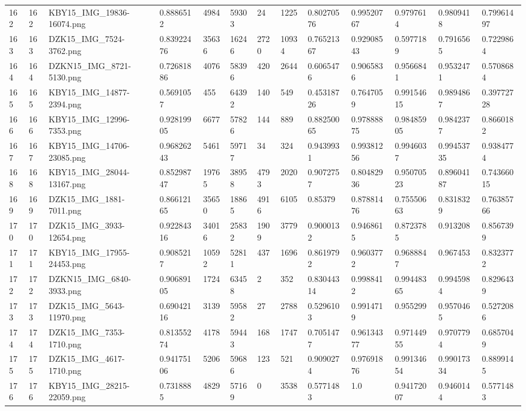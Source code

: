 \documentclass[11pt, a4paper, twoside]{report}
\begin{document}
\begin{longtable}[c]{@{}lllllllllllll@{}}
162 & 162 & KBY15\_IMG\_19836-16074.png & 0.8886512 & 4984 & 59303 & 24 & 1225 & 0.80270576 & 0.99520767 & 0.9797614 & 0.9809418 & 0.79961497 \\
163 & 163 & DZK15\_IMG\_7524-3762.png & 0.83922476 & 35636 & 16246 & 2720 & 10934 & 0.76521367 & 0.92908543 & 0.5977189 & 0.7916565 & 0.7229864 \\
164 & 164 & DZKN15\_IMG\_8721-5130.png & 0.72681886 & 4076 & 58396 & 420 & 2644 & 0.6065476 & 0.9065836 & 0.9566841 & 0.9532471 & 0.5708684 \\
165 & 165 & KBY15\_IMG\_14877-2394.png & 0.5691057 & 455 & 64392 & 140 & 549 & 0.45318726 & 0.7647059 & 0.99154615 & 0.9894867 & 0.39772728 \\
166 & 166 & KBY15\_IMG\_12996-7353.png & 0.92819905 & 6677 & 57826 & 144 & 889 & 0.88250065 & 0.97888875 & 0.98485905 & 0.9842377 & 0.8660182 \\
167 & 167 & KBY15\_IMG\_14706-23085.png & 0.96826243 & 5461 & 59717 & 34 & 324 & 0.9439931 & 0.99381256 & 0.9946037 & 0.99453735 & 0.9384774 \\
168 & 168 & KBY15\_IMG\_28044-13167.png & 0.85298747 & 19765 & 38958 & 4793 & 2020 & 0.9072757 & 0.80482936 & 0.95070523 & 0.89604187 & 0.74366015 \\
169 & 169 & DZK15\_IMG\_1881-7011.png & 0.86612165 & 35650 & 18865 & 4916 & 6105 & 0.85379 & 0.87881476 & 0.75550663 & 0.8318329 & 0.76385766 \\
170 & 170 & DZK15\_IMG\_3933-12654.png & 0.92284316 & 34016 & 25832 & 1909 & 3779 & 0.9000132 & 0.9468615 & 0.8723785 & 0.913208 & 0.8567399 \\
171 & 171 & KBY15\_IMG\_17955-24453.png & 0.9085217 & 10592 & 52811 & 437 & 1696 & 0.8619792 & 0.9603772 & 0.9688847 & 0.967453 & 0.8323772 \\
172 & 172 & DZKN15\_IMG\_6840-3933.png & 0.90689105 & 1724 & 63458 & 2 & 352 & 0.83044314 & 0.9988412 & 0.99448365 & 0.9945984 & 0.8296439 \\
173 & 173 & DZK15\_IMG\_5643-11970.png & 0.69042116 & 3139 & 59582 & 27 & 2788 & 0.5296103 & 0.9914719 & 0.955299 & 0.9570465 & 0.5272086 \\
174 & 174 & DZK15\_IMG\_7353-1710.png & 0.81355274 & 4178 & 59443 & 168 & 1747 & 0.7051477 & 0.96134377 & 0.97144955 & 0.9707794 & 0.6857049 \\
175 & 175 & DZK15\_IMG\_4617-1710.png & 0.94175106 & 5206 & 59686 & 123 & 521 & 0.9090274 & 0.97691876 & 0.99134654 & 0.99017334 & 0.8899145 \\
176 & 176 & KBY15\_IMG\_28215-22059.png & 0.7318885 & 4829 & 57169 & 0 & 3538 & 0.5771483 & 1.0 & 0.94172007 & 0.9460144 & 0.5771483 \\

\end{longtable}
\end{document}
